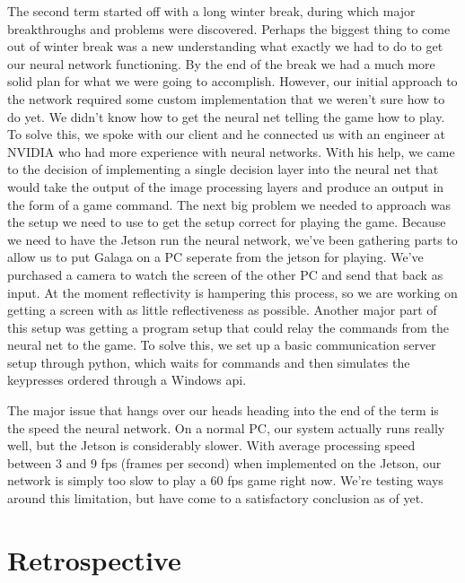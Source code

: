 \documentclass[onecolumn, draftclsnofoot,10pt, compsoc]{IEEEtran}
\begin{document}
\newline\newline
The second term started off with a long winter break, during which major breakthroughs and problems were discovered.
Perhaps the biggest thing to come out of winter break was a new understanding what exactly we had to do to get our neural network functioning.
By the end of the break we had a much more solid plan for what we were going to accomplish.
However, our initial approach to the network required some custom implementation that we weren't sure how to do yet.
We didn't know how to get the neural net telling the game how to play.
To solve this, we spoke with our client and he connected us with an engineer at NVIDIA who had more experience with neural networks.
With his help, we came to the decision of implementing a single decision layer into the neural net that would take the output of the image processing layers and produce an output in the form of a game command. 
\newline\newline
The next big problem we needed to approach was the setup we need to use to get the setup correct for playing the game.
Because we need to have the Jetson run the neural network, we've been gathering parts to allow us to put Galaga on a PC seperate from the jetson for playing.
We've purchased a camera to watch the screen of the other PC and send that back as input. 
At the moment reflectivity is hampering this process, so we are working on getting a screen with as little reflectiveness as possible.
Another major part of this setup was getting a program setup that could relay the commands from the neural net to the game.
To solve this, we set up a basic communication server setup through python, which waits for commands and then simulates the keypresses ordered through a Windows api.

The major issue that hangs over our heads heading into the end of the term is the speed the neural network.
On a normal PC, our system actually runs really well, but the Jetson is considerably slower. 
With average processing speed between 3 and 9 fps (frames per second) when implemented on the Jetson, our network is simply too slow to play a 60 fps game right now.
We're testing ways around this limitation, but have come to a satisfactory conclusion as of yet.

\section{Retrospective}
\end{document}
